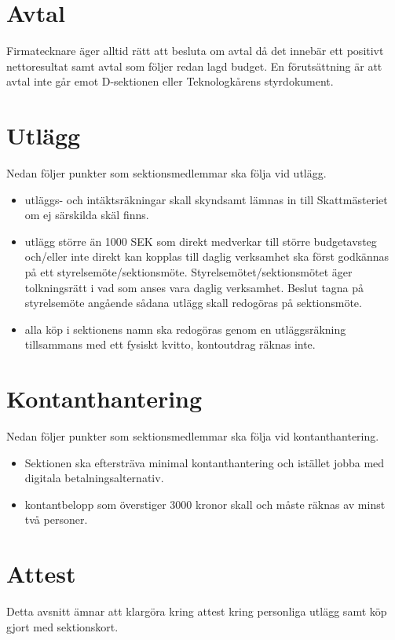 \documentclass{dsekprotokoll}
\begin{document}

\section{Avtal}
Firmatecknare äger alltid rätt att besluta om avtal då det innebär ett
positivt nettoresultat samt avtal som följer redan lagd budget. En förutsättning är att avtal
inte går emot D-sektionen eller Teknologkårens styrdokument.

\section{Utlägg}
Nedan följer punkter som sektionsmedlemmar ska följa vid utlägg.

\begin{itemize}
    \item utläggs- och intäktsräkningar skall skyndsamt lämnas in till Skattmästeriet om ej särskilda skäl finns.

    \item utlägg större än 1000 SEK som direkt medverkar till större budgetavsteg och/eller inte direkt kan kopplas till daglig verksamhet ska först godkännas på ett styrelsemöte/sektionsmöte. Styrelsemötet/sektionsmötet äger tolkningsrätt i vad som anses vara daglig verksamhet. Beslut tagna på styrelsemöte angående sådana utlägg skall redogöras på sektionsmöte.

    \item alla köp i sektionens namn ska redogöras genom en utläggsräkning tillsammans med ett fysiskt kvitto, kontoutdrag räknas inte.
\end{itemize}

\section{Kontanthantering}
Nedan följer punkter som sektionsmedlemmar ska följa vid kontanthantering.
\begin{itemize}
    \item Sektionen ska eftersträva minimal kontanthantering och istället jobba med digitala betalningsalternativ.
    \item kontantbelopp som överstiger 3000 kronor skall och måste räknas av minst två personer.
\end{itemize}

\section{Attest}
Detta avsnitt ämnar att klargöra kring attest kring personliga utlägg samt köp gjort med sektionskort.
\end{document}
